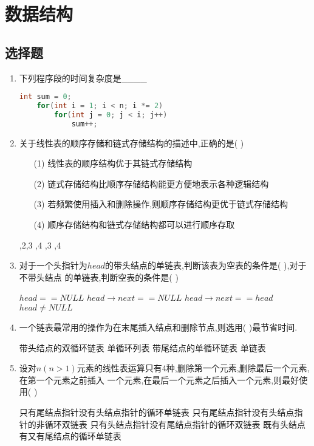 \documentclass[12pt, a4paper, oneside, UTF8]{ctexbook}
\begin{document}
% 
\else
\fi
\chapter{数据结构}
\section{选择题}
\begin{enumerate}
    \item \bt 下列程序段的时间复杂度是\_\_\_\_ 
    \begin{lstlisting}[language=C]
int sum = 0;
    for(int i = 1; i < n; i *= 2)
        for(int j = 0; j < i; j++)
            sum++;
    \end{lstlisting}


    \item 关于线性表的顺序存储和链式存储结构的描述中,正确的是(    ) 
    \begin{enumerate}
        \item [(1)] 线性表的顺序结构优于其链式存储结构
        \item [(2)] 链式存储结构比顺序存储结构能更方便地表示各种逻辑结构
        \item [(3)] 若频繁使用插入和删除操作,则顺序存储结构更优于链式存储结构
        \item [(4)] 顺序存储结构和链式存储结构都可以进行顺序存取 
    \end{enumerate}
    \begin{choices}
        ,2,3
        ,4
        ,3
        ,4
    \end{choices}

    \item 对于一个头指针为$head$的带头结点的单链表,判断该表为空表的条件是(   ),对于不带头结点
    的单链表,判断空表的条件是(   ) 
    \begin{choices}[2]
        \task $head == NULL$ 
        \task $head\rightarrow next == NULL$ 
        \task $head\rightarrow next == head$ 
        \task $head \neq NULL$
    \end{choices}


    \item 一个链表最常用的操作为在末尾插入结点和删除节点,则选用(   )最节省时间. 
    \begin{choices}[2]
        \task 带头结点的双循环链表
        \task 单循环列表
        \task 带尾结点的单循环链表
        \task 单链表
    \end{choices}

    \item 设对$n(n>1)$元素的线性表运算只有4种,删除第一个元素,删除最后一个元素,在第一个元素之前插入
    一个元素,在最后一个元素之后插入一个元素,则最好使用(    ) 
    \begin{choices}[1]
        \task 只有尾结点指针没有头结点指针的循环单链表
        \task 只有尾结点指针没有头结点指针的非循环双链表
        \task 只有头结点指针没有尾结点指针的循环双链表
        \task 既有头结点有又有尾结点的循环单链表
    \end{choices}



\end{enumerate}
\end{document}
